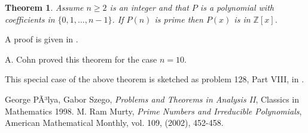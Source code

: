 \documentclass[12pt]{article}
\newtheorem*{theorem}{Theorem}
\begin{document}
 \begin{theorem} 
Assume $n  \geq 2$ is an integer  and that $P$ is a polynomial with coefficients in $\{0,1,\ldots,n-1\}$. If $P(n)$ is prime then $P(x)$ is  in $\mathbb{Z}[x]$.
 \end{theorem}
A proof is given in \cite{MRM}.

 A. Cohn \cite{PZ} proved this theorem for the case $n=10$.



This special case of the above theorem is sketched as problem 128, Part VIII, in \cite{PZ}.


 \begin{thebibliography}{0}
George PÃ³lya, Gabor Szego,
 {\it Problems and Theorems in Analysis II},
 Classics in Mathematics 1998.
M. Ram Murty, {\it Prime Numbers and Irreducible Polynomials}, American
Mathematical Monthly, vol. 109, (2002), 452-458.
 \end{thebibliography}
\end{document}
